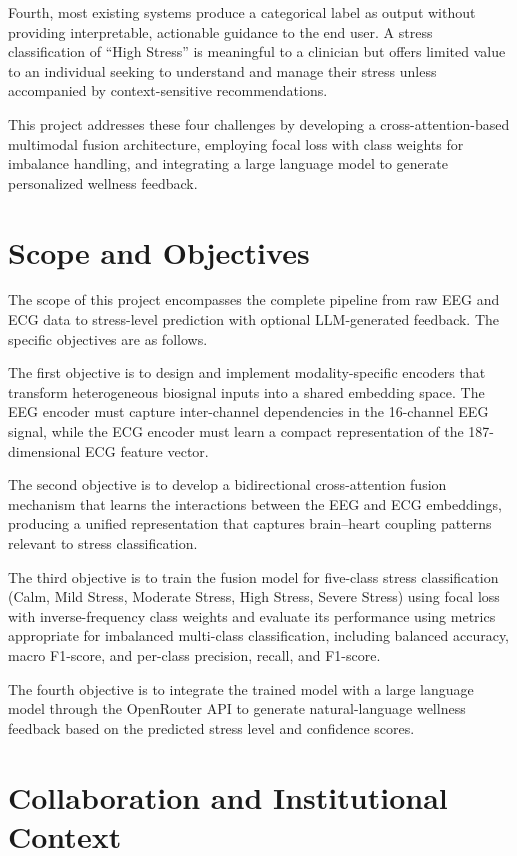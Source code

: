 \documentclass[12pt,letterpaper]{report}
\begin{document}
Fourth, most existing systems produce a categorical label as output without providing interpretable, actionable guidance to the end user. A stress classification of ``High Stress'' is meaningful to a clinician but offers limited value to an individual seeking to understand and manage their stress unless accompanied by context-sensitive recommendations.

This project addresses these four challenges by developing a cross-attention-based multimodal fusion architecture, employing focal loss with class weights for imbalance handling, and integrating a large language model to generate personalized wellness feedback.

\section{Scope and Objectives}
\label{sec:scope}

The scope of this project encompasses the complete pipeline from raw EEG and ECG data to stress-level prediction with optional LLM-generated feedback. The specific objectives are as follows.

The first objective is to design and implement modality-specific encoders that transform heterogeneous biosignal inputs into a shared embedding space. The EEG encoder must capture inter-channel dependencies in the 16-channel EEG signal, while the ECG encoder must learn a compact representation of the 187-dimensional ECG feature vector.

The second objective is to develop a bidirectional cross-attention fusion mechanism that learns the interactions between the EEG and ECG embeddings, producing a unified representation that captures brain--heart coupling patterns relevant to stress classification.

The third objective is to train the fusion model for five-class stress classification (Calm, Mild Stress, Moderate Stress, High Stress, Severe Stress) using focal loss with inverse-frequency class weights and evaluate its performance using metrics appropriate for imbalanced multi-class classification, including balanced accuracy, macro F1-score, and per-class precision, recall, and F1-score.

The fourth objective is to integrate the trained model with a large language model through the OpenRouter API to generate natural-language wellness feedback based on the predicted stress level and confidence scores.

\section{Collaboration and Institutional Context}
\label{sec:collaboration}
\end{document}
